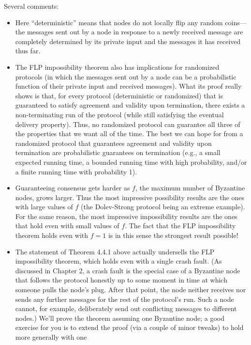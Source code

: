 Several comments:\\
\begin{itemize}
    \item Here “deterministic” means that nodes do not locally flip any random coins—the messages sent out by a node in response to a newly received message are completely
    determined by its private input and the messages it has received thus far.
    \item The FLP impossibility theorem also has implications for randomized protocols (in
    which the messages sent out by a node can be a probabilistic function of their private
    input and received messages). What its proof really shows is that, for every protocol
    (deterministic or randomized) that is guaranteed to satisfy agreement and validity upon
    termination, there exists a non-terminating run of the protocol (while still satisfying
    the eventual delivery property). Thus, no randomized protocol can guarantee all three of the properties that we want all of the time. The best we can hope for from a
    randomized protocol that guarantees agreement and validity upon termination are
    probabilistic guarantees on termination (e.g., a small expected running time, a bounded
    running time with high probability, and/or a finite running time with probability 1).
    \item Guaranteeing consensus gets harder as $f$, the maximum number of Byzantine nodes,
    grows larger. Thus the most impressive possibility results are the ones with large values
    of $f$ (the Dolev-Strong protocol being an extreme example). For the same reason, the
    most impressive impossibility results are the ones that hold even with small values
    of $f$. The fact that the FLP impossibility theorem holds even with $f = 1$ is in this
    sense the strongest result possible!
    \item The statement of Theorem 4.4.1 above actually undersells the FLP impossibility theorem,
    which holds even with a single crash fault. (As discussed in Chapter 2, a crash fault
    is the special case of a Byzantine node that follows the protocol honestly up to some
    moment in time at which someone pulls the node’s plug. After that point, the node
    neither receives nor sends any further messages for the rest of the protocol’s run. Such
    a node cannot, for example, deliberately send out conflicting messages to different
    nodes.) We’ll prove the theorem assuming one Byzantine node; a good exercise for you
    is to extend the proof (via a couple of minor tweaks) to hold more generally with one

\end{itemize}
